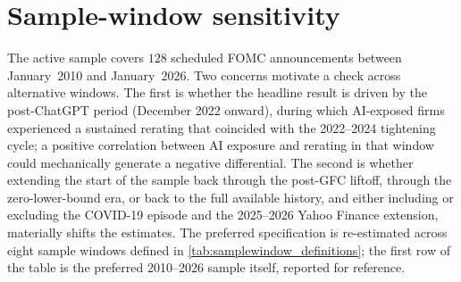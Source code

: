 \section{Sample-window sensitivity}
\label{sec:rob-samplewindows}

The active sample covers $128$ scheduled FOMC announcements between
January~2010 and January~2026. Two concerns motivate a check across
alternative windows. The first is whether the headline result is
driven by the post-ChatGPT period (December 2022 onward), during
which AI-exposed firms experienced a sustained rerating that
coincided with the 2022--2024 tightening cycle; a positive
correlation between AI exposure and rerating in that window could
mechanically generate a negative differential. The second is whether
extending the start of the sample back through the post-GFC liftoff,
through the zero-lower-bound era, or back to the full available
history, and either including or excluding the COVID-19 episode and
the 2025--2026 Yahoo Finance extension, materially shifts the
estimates. The preferred specification is re-estimated across eight
sample windows defined in
\cref{tab:samplewindow_definitions}; the first row of the table is
the preferred 2010--2026 sample itself, reported for reference.

\begin{table}[htbp]
\centering\small
\caption[Sample-window definitions]{Sample-window definitions}
\label{tab:samplewindow_definitions}

\end{table}

\begin{table}[htbp]
\centering\small
\caption[Sample-window sensitivity: High AI--No AI key-horizon
estimates]{Sample-window sensitivity: High AI--No AI key-horizon
estimates}
\label{tab:samplewindow_key}

\end{table}

